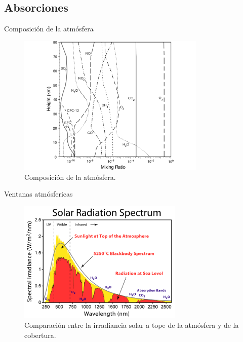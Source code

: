 \documentclass[]{beamer}
\begin{document}
\subsection{Absorciones}

\begin{frame}{Composición de la atmósfera}
  \begin{figure}
  \centering
  \includegraphics[width=0.8\textwidth]{imagenes/composicion.png}
  \caption{Composición de la atmósfera.}
  \end{figure}
\end{frame}

\begin{frame}{Ventanas atmósfericas}
  \begin{figure}
  \centering
  \includegraphics[width=0.7\textwidth]{imagenes/solar_spectrum.png}
    \caption{Comparación entre la irradiancia solar a tope de la atmósfera y de la cobertura.}
  \end{figure}
\end{frame}
\end{document}
